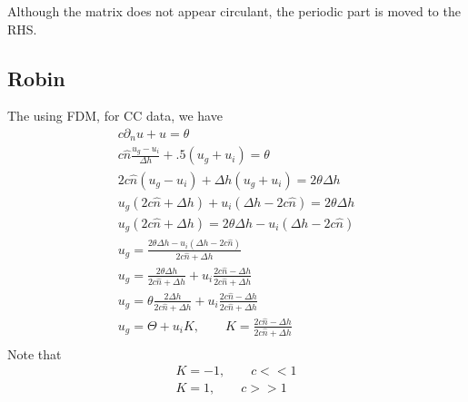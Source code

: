 \documentclass[landscape]{article}
\newcommand{\PD}{\partial}
\begin{document}
Although the matrix does not appear circulant, the periodic part is moved to the RHS.

\subsection{Robin}
The using FDM, for CC data, we have
\begin{equation}\begin{aligned}
  c \PD_n u + u = \theta \\
  c \hat{n} \frac{u_g - u_i}{\Delta h} + .5 (u_g+u_i) = \theta \\
  2 c \hat{n} (u_g - u_i) + \Delta h (u_g+u_i) = 2 \theta \Delta h \\
  u_g (2 c \hat{n} + \Delta h) + u_i (\Delta h - 2c \hat{n}) = 2 \theta \Delta h \\
  u_g (2 c \hat{n} + \Delta h) = 2 \theta \Delta h - u_i (\Delta h - 2c \hat{n}) \\
  u_g = \frac{2 \theta \Delta h - u_i (\Delta h - 2c \hat{n})}{2 c \hat{n} + \Delta h} \\
  u_g = \frac{2 \theta \Delta h}{2 c \hat{n} + \Delta h} + u_i \frac{2c \hat{n} - \Delta h}{2 c \hat{n} + \Delta h} \\
  u_g = \theta \frac{2 \Delta h}{2 c \hat{n} + \Delta h} + u_i \frac{2c \hat{n} - \Delta h}{2 c \hat{n} + \Delta h} \\
  u_g = \Theta + u_i K, \qquad K = \frac{2c \hat{n} - \Delta h}{2 c \hat{n} + \Delta h} \\
\end{aligned}\end{equation}
Note that
\begin{equation}\begin{aligned}
  K = -1 , \qquad c<<1 \\
  K = 1  , \qquad c>>1 \\
\end{aligned}\end{equation}
\end{document}
